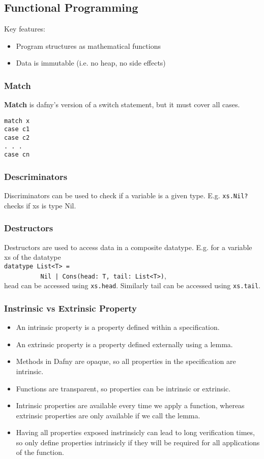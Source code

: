 \subsection{Functional Programming}
Key features:
\begin{itemize}
        \item Program structures as mathematical functions
        \item Data is immutable (i.e. no heap, no side effects)
\end{itemize}

\subsubsection{Match}

\textbf{Match} is dafny's version of a switch statement, but it must cover all cases.
\begin{verbatim}
match x
case c1
case c2
. . .
case cn
\end{verbatim}

\subsubsection{Descriminators}
Discriminators can be used to check if a variable is a given type. E.g. \verb!xs.Nil?! checks if xs is type Nil.

\subsubsection{Destructors}
Destructors are used to access data in a composite datatype. E.g. for a variable xs of the datatype\\
\verb!datatype List<T> =!\\
\verb!          Nil | Cons(head: T, tail: List<T>)!,\\
head can be accessed using \verb!xs.head!. Similarly tail can be accessed using \verb!xs.tail!.

\subsubsection{Instrinsic vs Extrinsic Property}
\begin{itemize}
        \item An intrinsic property is a property defined within a specification.
        \item An extrinsic property is a property defined externally using a lemma.
        \item Methods in Dafny are opaque, so all properties in the specification are intrinsic.
        \item Functions are transparent, so properties can be intrinsic or extrinsic.
        \item Intrinsic properties are available every time we apply a function, whereas extrinsic properties are only available if we call the lemma.
        \item Having all properties exposed instrinsicly can lead to long verification times, so only define properties intrinsicly if they will be required for all applications of the function.
\end{itemize}